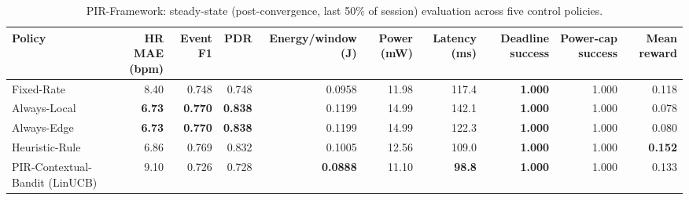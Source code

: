 \begin{table}[t]
\centering
\caption{PIR-Framework: steady-state (post-convergence, last 50\% of session) evaluation across five control policies.}
\label{tab:pir_overall}
\begin{tabular}{lrrrrrrrrr}
\toprule
Policy & HR MAE (bpm) & Event F1 & PDR & Energy/window (J) & Power (mW) & Latency (ms) & Deadline success & Power-cap success & Mean reward \\
\midrule
Fixed-Rate & 8.40 & 0.748 & 0.748 & 0.0958 & 11.98 & 117.4 & \textbf{1.000} & 1.000 & 0.118 \\
Always-Local & \textbf{6.73} & \textbf{0.770} & \textbf{0.838} & 0.1199 & 14.99 & 142.1 & \textbf{1.000} & 1.000 & 0.078 \\
Always-Edge & \textbf{6.73} & \textbf{0.770} & \textbf{0.838} & 0.1199 & 14.99 & 122.3 & \textbf{1.000} & 1.000 & 0.080 \\
Heuristic-Rule & 6.86 & 0.769 & 0.832 & 0.1005 & 12.56 & 109.0 & \textbf{1.000} & 1.000 & \textbf{0.152} \\
PIR-Contextual-Bandit (LinUCB) & 9.10 & 0.726 & 0.728 & \textbf{0.0888} & 11.10 & \textbf{98.8} & \textbf{1.000} & 1.000 & 0.133 \\
\bottomrule
\end{tabular}
\end{table}